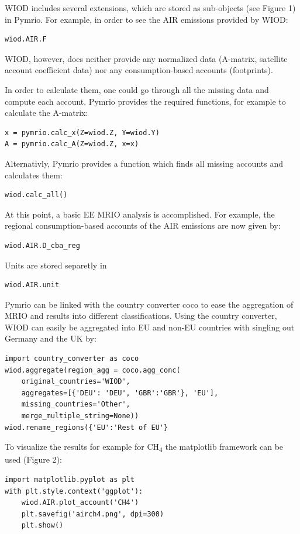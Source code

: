 \documentclass{jors}
\begin{document}
WIOD includes several extensions, which are stored as sub-objects (see Figure 1) in Pymrio. 
For example, in order to see the AIR emissions provided by WIOD:

\begin{lstlisting}
wiod.AIR.F
\end{lstlisting}

WIOD, however, does neither provide any normalized data (A-matrix, satellite account coefficient data) nor any consumption-based accounts (footprints).

In order to calculate them, one could go through all the missing data and compute each account. 
Pymrio provides the required functions, for example to calculate the A-matrix:
\begin{lstlisting}
x = pymrio.calc_x(Z=wiod.Z, Y=wiod.Y)
A = pymrio.calc_A(Z=wiod.Z, x=x)
\end{lstlisting}

Alternativly, Pymrio provides a function which finds all missing accounts and calculates them:
\begin{lstlisting}
wiod.calc_all()
\end{lstlisting}

At this point, a basic EE MRIO analysis is accomplished. For example, the regional consumption-based accounts of the AIR emissions are now given by:
\begin{lstlisting}
wiod.AIR.D_cba_reg
\end{lstlisting}

Units are stored separetly in 
\begin{lstlisting}
wiod.AIR.unit
\end{lstlisting}

Pymrio can be linked with the country converter coco \cite{stadler2017_country} to ease the aggregation of MRIO and results into different classifications.
Using the country converter, WIOD can easily be aggregated into EU and non-EU countries with singling out Germany and the UK by:

\begin{lstlisting}
import country_converter as coco
wiod.aggregate(region_agg = coco.agg_conc(
    original_countries='WIOD',
    aggregates=[{'DEU': 'DEU', 'GBR':'GBR'}, 'EU'],
    missing_countries='Other',
    merge_multiple_string=None))
wiod.rename_regions({'EU':'Rest of EU'}
\end{lstlisting}

To visualize the results for example for CH\textsubscript{4} the matplotlib framework \cite{hunter2007_Matplotlib} can be used (Figure 2):
\begin{lstlisting}
import matplotlib.pyplot as plt
with plt.style.context('ggplot'):
    wiod.AIR.plot_account('CH4')
    plt.savefig('airch4.png', dpi=300)
    plt.show()
\end{lstlisting}
\end{document}
